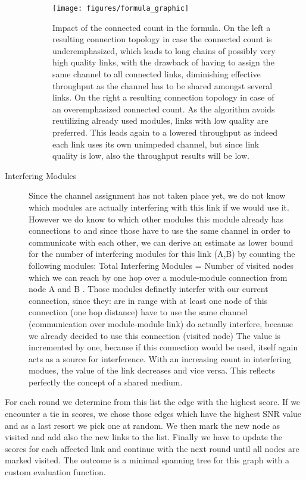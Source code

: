 \begin{description}
    \begin{figure}[h]
      \centering
      \texttt{[image: figures/formula\_graphic]}
      \caption{Impact of the connected count in the formula. On the left a resulting connection topology in case the connected count is underemphasized,
      which leads to long chains of possibly very high quality links, with the drawback of having to assign the same channel to all connected links, 
      diminishing effective throughput as the channel has to be shared amongst several links. 
      On the right a resulting connection topology in case of an overemphasized connected count. As the algorithm avoids reutilizing already used modules,
      links with low quality are preferred. This leads again to a lowered throughput as indeed each link uses its own unimpeded channel, but since link quality is low, also 
      the throughput results will be low.}
      \label{fig:formula_graphic}
    \end{figure}
    
    \item[Interfering Modules]
    Since the channel assignment has not taken place yet, we do not know which modules are actually interfering with this link if we would use it.
    However we do know to which other modules this module already has connections to and since those have to use the same channel in order to communicate with each
    other, we can derive an estimate as lower bound for the number of interfering modules for this link (A,B) by counting the following modules:
    Total Interfering Modules = Number of visited nodes which we can reach by one hop over a module-module connection from node A and B
    . Those modules definetly interfer with our current connection, since they:
      are in range with at least one node of this connection (one hop distance)
      have to use the same channel (communication over module-module link)
      do actually interfere, because we already decided to use this connection (visited node)
    The value is incremented by one, because if this connection would be used, itself again acts as a source for interference.
    With an increasing count in interfering modues, the value of the link decreases and vice versa. This reflects perfectly the concept of a shared medium.
  \end{description}
  For each round we determine from this list the edge with the highest score. If we encounter a tie in scores, we chose those edges which have the highest SNR value and as a last
  resort we pick one at random. We then mark the new node as visited and add also the new links to the list.
  Finally we have to update the scores for each affected link and continue with the next round until all nodes are marked visited.
  The outcome is a minimal spanning tree for this graph with a custom evaluation function.
